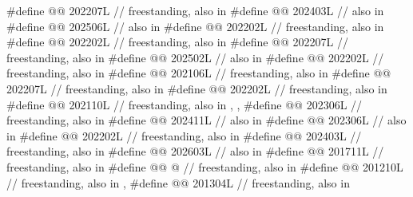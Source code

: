\begin{codeblock}
#define @@                       202207L // freestanding, also in 
#define @@            202403L // also in 
#define @@                    202506L // also in 
#define @@                       202202L // freestanding, also in 
#define @@                  202202L // freestanding, also in 
#define @@                     202207L // freestanding, also in 
#define @@               202502L // also in 
#define @@                      202202L // freestanding, also in 
#define @@           202106L // freestanding, also in 
#define @@                     202207L // freestanding, also in 
#define @@               202202L // freestanding, also in 
#define @@                        202110L
  // freestanding, also in , , 
#define @@                             202306L // freestanding, also in 
#define @@             202411L // also in 
#define @@                               202306L // also in 
#define @@          202202L // freestanding, also in 
#define @@                 202403L // freestanding, also in 
#define @@                        202603L // also in 
#define @@                      201711L // freestanding, also in 
#define @@ @\seebelow@
  // freestanding, also in 
#define @@                  201210L
  // freestanding, also in , 
#define @@       201304L // freestanding, also in 

\end{codeblock}
